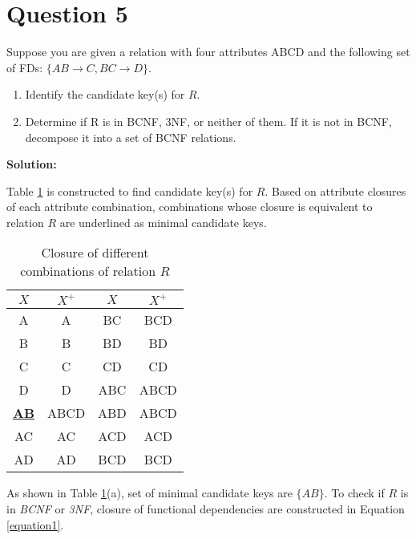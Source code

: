 
\section*{Question 5}

Suppose you are given a relation with four attributes ABCD and the following set of FDs: $\{AB\rightarrow C, BC\rightarrow D\}$.

\begin{enumerate}[label=(\alph*)]
\item Identify the candidate key(s) for $R$.
\item Determine if R is in BCNF, 3NF, or neither of them. If it is not in BCNF, decompose it into a set of BCNF relations.
\end{enumerate}

\textbf{Solution:}

Table \ref{table1} is constructed to find candidate key(s) for $R$. Based on attribute closures of each attribute combination, combinations whose closure is equivalent to relation $R$ are underlined as minimal candidate keys.

\begin{table}[H]
\centering\caption{Closure of different combinations of relation $R$}\label{table1}
\begin{tabular}{|c|c||c|c|}
\hline
$X$ & $X^+$ & $X$ & $X^+$\\
\hline
A & A & BC & BCD\\
B & B & BD & BD\\
C & C & CD & CD\\
D & D & ABC & ABCD\\
\underline{\bf AB} & ABCD & ABD & ABCD\\
AC & AC & ACD & ACD\\
AD & AD & BCD & BCD\\
\hline
\end{tabular}
\end{table}

As shown in Table \ref{table1}(a), set of minimal candidate keys are $\{AB\}$.
To check if $R$ is in \textit{BCNF} or \textit{3NF}, closure of functional dependencies are constructed in Equation \ref{equation1}.

